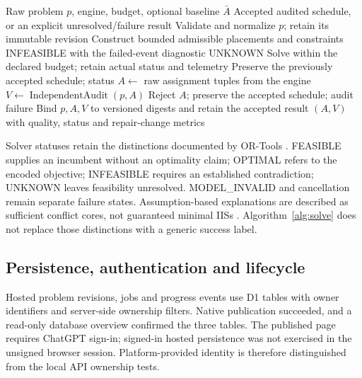 \documentclass[pdflatex,sn-mathphys-num]{sn-jnl}
\theoremstyle{thmstyleone}
\theoremstyle{thmstyletwo}
\theoremstyle{thmstylethree}
\begin{document}
\begin{algorithm}[t]
\caption{Generate, independently check and accept a timetable}\label{alg:solve}
\begin{algorithmic}[1]
\Require Raw problem $p$, engine, budget, optional baseline $\bar A$
\Ensure Accepted audited schedule, or an explicit unresolved/failure result
\State Validate and normalize $p$; retain its immutable revision
\State Construct bounded admissible placements and constraints
  \State \Return INFEASIBLE with the failed-event diagnostic
\EndIf
{}
  \State \Return UNKNOWN
\EndIf
\State Solve within the declared budget; retain actual status and telemetry
  \State Preserve the previously accepted schedule; \Return status
\EndIf
\State $A\gets$ raw assignment tuples from the engine
\State $V\gets\operatorname{IndependentAudit}(p,A)$
  \State Reject $A$; preserve the accepted schedule; \Return audit failure
\EndIf
\State Bind $p,A,V$ to versioned digests and retain the accepted result
\State \Return $(A,V)$ with quality, status and repair-change metrics
\end{algorithmic}
\end{algorithm}

Solver statuses retain the distinctions documented by OR-Tools \cite{D07}. FEASIBLE supplies an incumbent without an optimality claim; OPTIMAL refers to the encoded objective; INFEASIBLE requires an established contradiction; UNKNOWN leaves feasibility unresolved. MODEL\_INVALID and cancellation remain separate failure states. Assumption-based explanations are described as sufficient conflict cores, not guaranteed minimal IISs \cite{D08}. Algorithm~\ref{alg:solve} does not replace those distinctions with a generic success label.

\subsection{Persistence, authentication and lifecycle}

Hosted problem revisions, jobs and progress events use D1 tables with owner identifiers and server-side ownership filters. Native publication succeeded, and a read-only database overview confirmed the three tables. The published page requires ChatGPT sign-in; signed-in hosted persistence was not exercised in the unsigned browser session. Platform-provided identity is therefore distinguished from the local API ownership tests.
\end{document}
